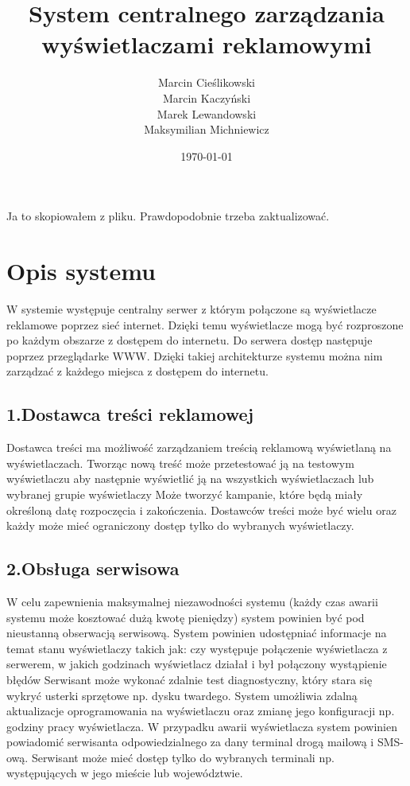 \documentclass[a4paper,titlepage,twoside,openright]{report} %
\begin{document}
	

	\title{System centralnego zarządzania wyświetlaczami reklamowymi}
	\author{Marcin Cieślikowski\\
		Marcin Kaczyński\\
		Marek Lewandowski\\
		Maksymilian Michniewicz\\}
	\date{\today}
	\maketitle
	\tableofcontents
	\newpage
	

		Ja to skopiowałem z pliku. Prawdopodobnie trzeba zaktualizować.
		\section{Opis systemu}
			W systemie występuje centralny serwer z którym połączone są wyświetlacze reklamowe poprzez sieć internet. Dzięki temu wyświetlacze mogą być rozproszone po każdym obszarze z dostępem do internetu. Do serwera dostęp następuje poprzez przeglądarke WWW. Dzięki takiej architekturze systemu można nim zarządzać z każdego miejsca z dostępem do internetu.
			\subsection{1.Dostawca treści reklamowej}
				Dostawca treści ma możliwość zarządzaniem treścią reklamową wyświetlaną na wyświetlaczach. Tworząc nową treść może przetestować ją na testowym wyświetlaczu aby następnie wyświetlić ją na wszystkich wyświetlaczach lub wybranej grupie wyświetlaczy Może tworzyć kampanie, które będą miały określoną datę rozpoczęcia i zakończenia. Dostawców treści może być wielu oraz każdy może mieć ograniczony dostęp tylko do wybranych wyświetlaczy.
			\subsection{2.Obsługa serwisowa}
				W celu zapewnienia maksymalnej niezawodności systemu (każdy czas awarii systemu może kosztować dużą kwotę pieniędzy) system powinien być pod nieustanną obserwacją serwisową. System powinien udostępniać informacje na temat stanu wyświetlaczy takich jak:
				czy występuje połączenie wyświetlacza z serwerem,
 				w jakich godzinach wyświetlacz działał i był połączony
 				wystąpienie błędów 
				Serwisant może wykonać zdalnie test diagnostyczny, który stara się wykryć usterki sprzętowe np. dysku twardego. System umożliwia zdalną aktualizacje oprogramowania na wyświetlaczu oraz zmianę jego konfiguracji np. godziny pracy wyświetlacza. W przypadku awarii wyświetlacza system powinien powiadomić serwisanta odpowiedzialnego za dany terminal drogą mailową i SMS-ową. Serwisant może mieć dostęp tylko do wybranych terminali np. występujących w jego mieście lub województwie. 
\end{document}
